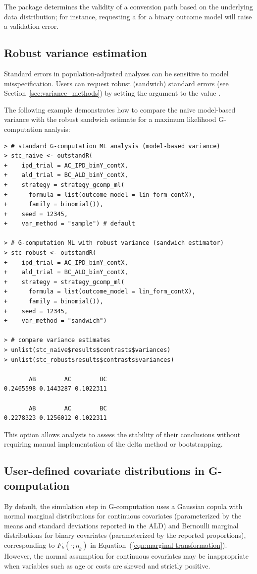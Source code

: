 \documentclass[article]{jss}
\begin{document}
The package determines the validity of a conversion path based on the underlying data distribution; for instance, requesting a  for a binary outcome model will raise a validation error.

%
\subsection{Robust variance estimation}
Standard errors in population-adjusted analyses can be sensitive to model misspecification. Users can request robust (sandwich) standard errors (see Section~\ref{sec:variance_methods}) by setting the argument  to the value . 

The following example demonstrates how to compare the naive model-based variance with the robust sandwich estimate for a maximum likelihood G-computation analysis:

\begin{verbatim}
> # standard G-computation ML analysis (model-based variance)
> stc_naive <- outstandR(
+    ipd_trial = AC_IPD_binY_contX,
+    ald_trial = BC_ALD_binY_contX,
+    strategy = strategy_gcomp_ml(
+      formula = list(outcome_model = lin_form_contX),
+      family = binomial()),
+    seed = 12345,
+    var_method = "sample") # default

> # G-computation ML with robust variance (sandwich estimator)
> stc_robust <- outstandR(
+    ipd_trial = AC_IPD_binY_contX,
+    ald_trial = BC_ALD_binY_contX,
+    strategy = strategy_gcomp_ml(
+      formula = list(outcome_model = lin_form_contX),
+      family = binomial()),
+    seed = 12345,
+    var_method = "sandwich")

> # compare variance estimates
> unlist(stc_naive$results$contrasts$variances)
> unlist(stc_robust$results$contrasts$variances)

       AB        AC        BC 
0.2465598 0.1443287 0.1022311 

       AB        AC        BC 
0.2278323 0.1256012 0.1022311 
\end{verbatim}

This option allows analysts to assess the stability of their conclusions without requiring manual implementation of the delta method or bootstrapping.

%
\subsection{User-defined covariate distributions in G-computation}
By default, the simulation step in G-computation uses a Gaussian copula with normal marginal distributions for continuous covariates (parameterized by the means and standard deviations reported in the ALD) and Bernoulli marginal distributions for binary covariates (parameterized by the reported proportions), corresponding to $F_k(\cdot; \eta_k)$ in Equation~(\ref{eqn:marginal-transformation}). However, the normal assumption for continuous covariates may be inappropriate when variables such as age or costs are skewed and strictly positive.
\end{document}
